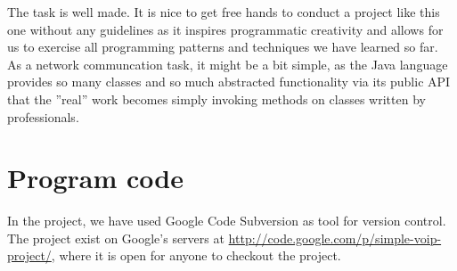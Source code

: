 \documentclass[a4paper,titlepage]{article}
\begin{document}
The task is well made. It is nice to get free hands to conduct a project like this one without any guidelines as it inspires programmatic creativity and allows for us to exercise all programming patterns and techniques we have learned so far. As a network communcation task, it might be a bit simple, as the Java language provides so many classes and so much abstracted functionality via its public API that the ''real'' work becomes simply invoking methods on classes written by professionals.

\section{Program code}
In the project, we have used Google Code Subversion as tool for version control. The project exist on Google’s servers at \url{http://code.google.com/p/simple-voip-project/}, where it is open for anyone to checkout the project.
\end{document}
